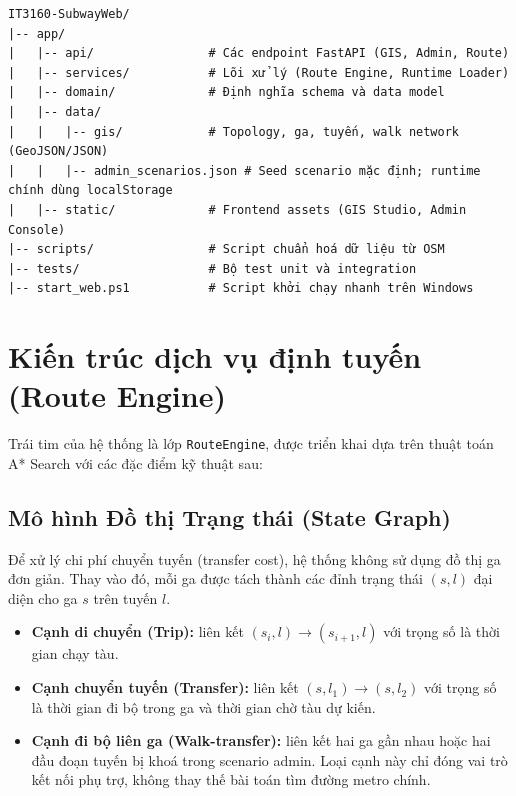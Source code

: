﻿\documentclass[../DoAn.tex]{subfiles}
\begin{document}
\begin{tcolorbox}[
  enhanced,
  title={Đoạn mã: Cấu trúc chính của repository},
  fonttitle=\bfseries\small,
  colframe=codeframe,
  colback=codeback,
  coltitle=black,
  colbacktitle=codeheader,
  boxrule=0.5mm,
  arc=2mm,
  drop shadow,
  before=\par\vspace{8pt}\needspace{12\baselineskip},
  after=\par\vspace{10pt}
]
\begin{verbatim}
IT3160-SubwayWeb/
|-- app/
|   |-- api/                # Các endpoint FastAPI (GIS, Admin, Route)
|   |-- services/           # Lõi xử lý (Route Engine, Runtime Loader)
|   |-- domain/             # Định nghĩa schema và data model
|   |-- data/
|   |   |-- gis/            # Topology, ga, tuyến, walk network (GeoJSON/JSON)
|   |   |-- admin_scenarios.json # Seed scenario mặc định; runtime chính dùng localStorage
|   |-- static/             # Frontend assets (GIS Studio, Admin Console)
|-- scripts/                # Script chuẩn hoá dữ liệu từ OSM
|-- tests/                  # Bộ test unit và integration
|-- start_web.ps1           # Script khởi chạy nhanh trên Windows
\end{verbatim}
\end{tcolorbox}

\section{Kiến trúc dịch vụ định tuyến (Route Engine)}
Trái tim của hệ thống là lớp \texttt{RouteEngine}, được triển khai dựa trên thuật toán A* Search với các đặc điểm kỹ thuật sau:

\subsection{Mô hình Đồ thị Trạng thái (State Graph)}
Để xử lý chi phí chuyển tuyến (transfer cost), hệ thống không sử dụng đồ thị ga đơn giản. Thay vào đó, mỗi ga được tách thành các đỉnh trạng thái $(s, l)$ đại diện cho ga $s$ trên tuyến $l$. 
\begin{itemize}
    \item \textbf{Cạnh di chuyển (Trip):} liên kết $(s_i, l) \to (s_{i+1}, l)$ với trọng số là thời gian chạy tàu.
    \item \textbf{Cạnh chuyển tuyến (Transfer):} liên kết $(s, l_1) \to (s, l_2)$ với trọng số là thời gian đi bộ trong ga và thời gian chờ tàu dự kiến.
    \item \textbf{Cạnh đi bộ liên ga (Walk-transfer):} liên kết hai ga gần nhau hoặc hai đầu đoạn tuyến bị khoá trong scenario admin. Loại cạnh này chỉ đóng vai trò kết nối phụ trợ, không thay thế bài toán tìm đường metro chính.
\end{itemize}
\end{document}
